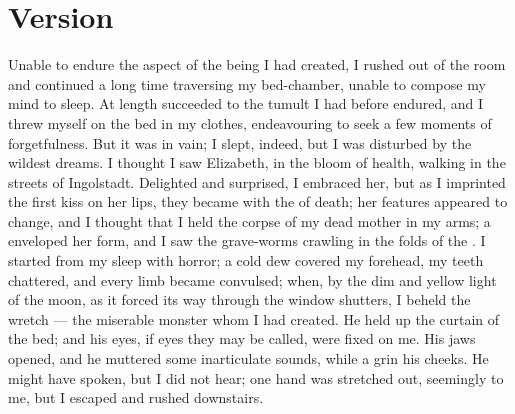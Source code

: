 \documentclass{fiche}
\begin{document}
\newpage
\section{Version}

\begin{version}
Unable to endure the aspect of the being I had created, I rushed out of the room and continued
a long time traversing my bed-chamber, unable to compose my mind to sleep. At length
 succeeded to the tumult I had before endured, and I
threw myself on the bed in my clothes, endeavouring to seek a few moments of forgetfulness.
But it was in vain; I slept, indeed, but I was disturbed by the wildest dreams. I thought I
saw Elizabeth, in the bloom of health, walking in the streets of Ingolstadt. Delighted and
surprised, I embraced her, but as I imprinted the first kiss on her lips, they became
 with the  of death; her features
appeared to change, and I thought that I held the corpse of my dead mother in my arms; a
 enveloped her form, and I saw the grave-worms crawling in
the folds of the . I started from my sleep with horror; a
cold dew covered my forehead, my teeth chattered, and every limb became convulsed; when, by
the dim and yellow light of the moon, as it forced its way through the window shutters, I
beheld the wretch --- the miserable monster whom I had created. He held up the curtain of the
bed; and his eyes, if eyes they may be called, were fixed on me. His jaws opened, and he
muttered some inarticulate sounds, while a grin  his cheeks.
He might have spoken, but I did not hear; one hand was stretched out, seemingly to
 me, but I escaped and rushed downstairs.
\end{version}

\end{document}
